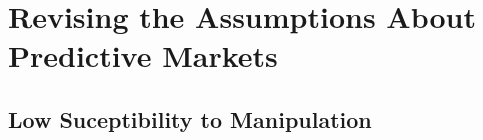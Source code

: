 \section{Revising the Assumptions About Predictive Markets}
\label{sec:revising_assumptions}

\subsection{Low Suceptibility to Manipulation}
\label{subsec:low_susceptibility_to_manipulation}


